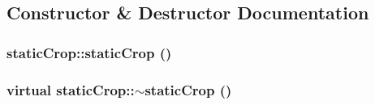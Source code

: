 \subsection{Constructor \& Destructor Documentation}
\hypertarget{classstatic_crop_ab27f8e19e723919d605c420136dc4b7c}{
\subsubsection[{staticCrop}]{\setlength{\rightskip}{0pt plus 5cm}staticCrop::staticCrop ()}}
\label{classstatic_crop_ab27f8e19e723919d605c420136dc4b7c}
\hypertarget{classstatic_crop_a34f95010a196160c9e70f9156f25ad0d}{
\subsubsection[{$\sim$staticCrop}]{\setlength{\rightskip}{0pt plus 5cm}virtual staticCrop::$\sim$staticCrop ()}}
\label{classstatic_crop_a34f95010a196160c9e70f9156f25ad0d}


